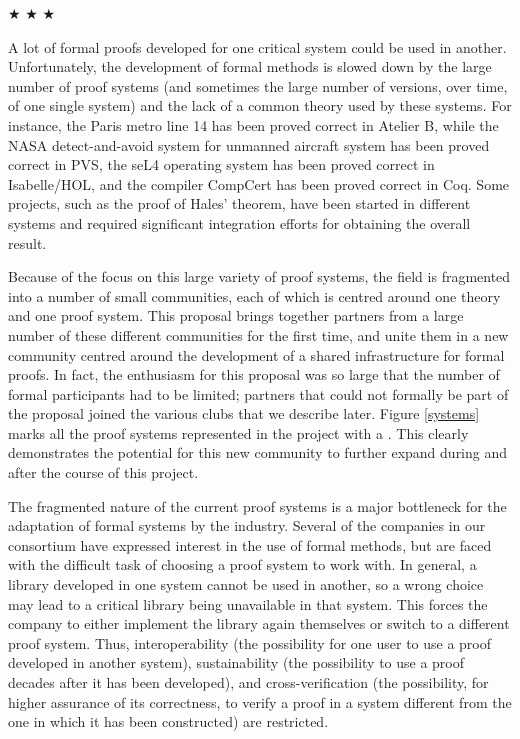 \begin{center}
$\bigstar$ $\bigstar$ $\bigstar$
\end{center}


A lot of formal proofs developed for one critical system could be used
in another.  Unfortunately, the development of formal methods is
slowed down by the large number of proof systems (and sometimes the
large number of versions, over time, of one single system) and the
lack of a common theory used by these systems.  For instance, the
Paris metro line 14 has been proved correct in Atelier B, while the
NASA detect-and-avoid system for unmanned aircraft system has been
proved correct in PVS, the seL4 operating system has been proved
correct in Isabelle/HOL\cite{paulson700}, and the compiler CompCert
has been proved correct in Coq.  Some projects, such as the proof of
Hales' theorem, have been started in different systems and required
significant integration efforts for obtaining the overall result.

Because of the focus on this large variety of proof systems, the field
is fragmented into a number of small communities, each of which is
centred around one theory and one proof system. This proposal brings
together partners from a large number of these different communities
for the first time, and unite them in a new community
centred around the development of a shared infrastructure for formal
proofs.  In fact, the enthusiasm for this proposal was so large that the number
of formal participants had to be limited; partners that could not
formally be part of the proposal joined the various clubs that we
describe later.  Figure
\ref{systems} marks all the proof systems represented in the project
with a \s. This clearly demonstrates the potential for this new
community to further expand during and after the course of this project.

The fragmented nature of the current proof systems is a major
bottleneck for the adaptation of formal systems by the
industry. Several of the companies in our consortium have expressed
interest in the use of formal methods, but are faced with the
difficult task of choosing a proof system to work with. In general, a
library developed in one system cannot be used in another, so a wrong
choice may lead to a critical library being unavailable in that
system. This forces the company to either implement the library again
themselves or switch to a different proof system.  Thus,
interoperability (the possibility for one user to use a proof
developed in another system), sustainability (the possibility to use a
proof decades after it has been developed), and cross-verification
(the possibility, for higher assurance of its correctness, to verify a
proof in a system different from the one in which it has been constructed) are restricted.

